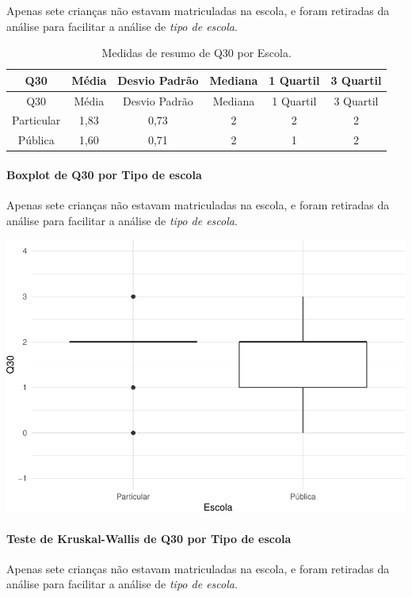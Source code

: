 \documentclass[]{article}
\let\oldparagraph\paragraph
\renewcommand{\paragraph}[1]{\oldparagraph{#1}\mbox{}}
\begin{document}
Apenas sete crianças não estavam matriculadas na escola, e foram retiradas da análise para facilitar a análise de \emph{tipo de escola}.

\begin{longtable}[]{@{}cccccc@{}}
\caption{\label{tab:unnamed-chunk-1000}Medidas de resumo de Q30 por Escola.}\tabularnewline
\toprule
Q30 & Média & Desvio Padrão & Mediana & 1 Quartil & 3 Quartil\tabularnewline
\midrule
\endfirsthead
\toprule
Q30 & Média & Desvio Padrão & Mediana & 1 Quartil & 3 Quartil\tabularnewline
\midrule
\endhead
Particular & 1,83 & 0,73 & 2 & 2 & 2\tabularnewline
Pública & 1,60 & 0,71 & 2 & 1 & 2\tabularnewline
\bottomrule
\end{longtable}

\hypertarget{boxplot-de-q30-por-tipo-de-escola}{%
\paragraph{Boxplot de Q30 por Tipo de escola}\label{boxplot-de-q30-por-tipo-de-escola}}

Apenas sete crianças não estavam matriculadas na escola, e foram retiradas da análise para facilitar a análise de \emph{tipo de escola}.

\begin{center}\includegraphics[width=0.75\linewidth]{relatorio_covid19_files/figure-latex/unnamed-chunk-1001-1} \end{center}

\hypertarget{teste-de-kruskal-wallis-de-q30-por-tipo-de-escola}{%
\paragraph{Teste de Kruskal-Wallis de Q30 por Tipo de escola}\label{teste-de-kruskal-wallis-de-q30-por-tipo-de-escola}}

Apenas sete crianças não estavam matriculadas na escola, e foram retiradas da análise para facilitar a análise de \emph{tipo de escola}.
\end{document}
